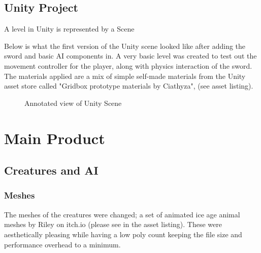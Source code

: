 \documentclass[11pt]{report}
\begin{document}
\subsection{Unity Project}

A level in Unity is represented by a Scene

Below is what the first version of the Unity scene looked like after adding the sword and basic AI components in. A very basic level was created to test out the movement controller for the player, along with physics interaction of the sword. The materials applied are a mix of simple self-made materials from the Unity asset store called "Gridbox prototype materials by Ciathyza", (see asset listing).

\begin{figure}[H]
    \centering
    \caption{Annotated view of Unity Scene}
\end{figure}




\section{Main Product}
\subsection{Creatures and AI}
\subsubsection{Meshes}
The meshes of the creatures were changed; a set of animated ice age animal meshes by Riley on itch.io (please see in the asset listing). These were aesthetically pleasing while having a low poly count keeping the file size and performance overhead to a minimum. 
\end{document}
